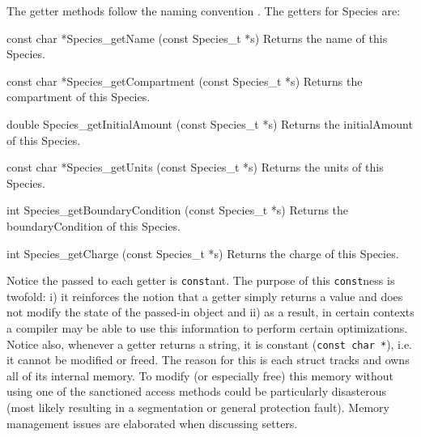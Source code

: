\documentclass{cekmanual}
\begin{document}
The getter methods follow the naming convention
.  The getters for Species are:


\begin{methoddef}{const char *Species\_getName (const Species\_t *s)}
  Returns the name of this Species.
\end{methoddef}

\begin{methoddef}{const char *Species\_getCompartment (const Species\_t *s)}
  Returns the compartment of this Species.
\end{methoddef}

\begin{methoddef}{double Species\_getInitialAmount (const Species\_t *s)}
  Returns the initialAmount of this Species.
\end{methoddef}

\begin{methoddef}{const char *Species\_getUnits (const Species\_t *s)}
  Returns the units of this Species.
\end{methoddef}

\begin{methoddef}{int Species\_getBoundaryCondition (const Species\_t *s)}
  Returns the boundaryCondition of this Species.
\end{methoddef}

\begin{methoddef}{int Species\_getCharge (const Species\_t *s)}
  Returns the charge of this Species.
\end{methoddef}

Notice the  passed to each getter is
\texttt{const}ant.  The purpose of this \texttt{const}ness is twofold:
i) it reinforces the notion that a getter simply returns a value and
does not modify the state of the passed-in object and ii) as a result,
in certain contexts a compiler may be able to use this information to
perform certain optimizations.  Notice also, whenever a getter returns
a string, it is constant (\texttt{const char *}), i.e. it cannot be
modified or freed.  The reason for this is each struct tracks and owns
all of its internal memory.  To modify (or especially free) this
memory without using one of the sanctioned access methods could be
particularly disasterous (most likely resulting in a segmentation or
general protection fault).  Memory management issues are elaborated
when discussing setters.


\end{document}
